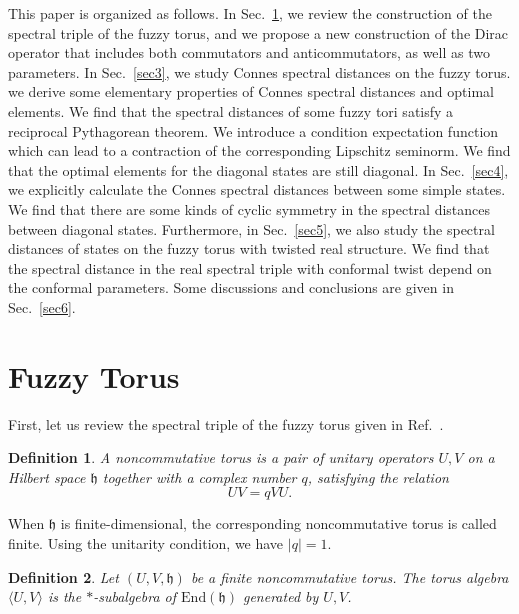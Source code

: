 \documentclass[a4paper,11pt]{article}
\newtheorem{definition}{Definition}
\begin{document}
This paper is organized as follows. In Sec.~\ref{sec2}, we review the construction of the spectral triple of the fuzzy torus, and we propose a new construction of the Dirac operator that includes both commutators and anticommutators, as well as two parameters. 
In Sec.~\ref{sec3}, we study Connes spectral distances on the fuzzy torus. we derive some elementary properties of Connes spectral distances and optimal elements. We find that the spectral distances of some fuzzy tori satisfy a reciprocal Pythagorean theorem.
We introduce a condition expectation function which can lead to a contraction of the corresponding Lipschitz seminorm.
We find that the optimal elements for the diagonal states are still diagonal.
In Sec.~\ref{sec4}, we explicitly calculate the Connes spectral distances between some simple states.
We find that there are some kinds of cyclic symmetry in the spectral distances between diagonal states.
Furthermore, in Sec.~\ref{sec5}, we also study the spectral distances of states on the fuzzy torus with twisted real structure. We find that the spectral distance in the real spectral
triple with conformal twist depend on the conformal parameters.
Some discussions and conclusions are given in Sec.~\ref{sec6}.






\section{Fuzzy Torus}\label{sec2}

First, let us review the spectral triple of the fuzzy torus given in Ref.~\cite{Bigatti1}.

\begin{definition}
  \cite{Bigatti1} A noncommutative torus is a pair of unitary operators $U, V$ on a
  Hilbert space $\mathfrak{h}$ together with a complex number $q$, satisfying
  the relation
  \begin{equation}
    UV = qVU.
  \end{equation}
\end{definition}

When $\mathfrak{h}$ is finite-dimensional, the corresponding noncommutative
torus is called finite. Using the unitarity condition, we have $|q| = 1$.

\begin{definition}
  \cite{Bigatti1} Let $(U, V, \mathfrak{h})$ be a finite noncommutative torus. The
  torus algebra $\langle U, V \rangle$ is the $\ast$-subalgebra of
  $\mathrm{End} (\mathfrak{h})$ generated by $U, V$.
\end{definition}
\end{document}
